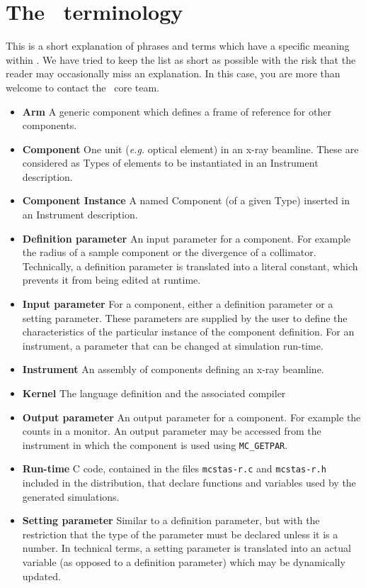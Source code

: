 
\chapter{The \MCX\ terminology}
\label{s:terminology}

This is a short explanation of phrases and terms which have a specific
meaning within \MCX. We have tried to keep the list as short
as possible with the risk that the reader may occasionally miss
an explanation. In this case, you are more than welcome to contact
the \MCX\ core team.

\noindent
\begin{itemize}
\item{\bfseries Arm}  A generic \MCX component which defines a frame of reference
      for other components.
\item{\bfseries Component} One unit ({\em e.g.} optical element) in an x-ray beamline. These are considered as Types of elements to be instantiated in an Instrument description.
\item{\bfseries Component Instance} A named Component (of a given Type) inserted in an Instrument description.
\item{\bfseries Definition parameter} An input parameter for a component. For
  example the radius of a sample component or the divergence of a collimator. Technically, a definition parameter 
  is translated into a literal constant, which prevents it from being edited at runtime. 
\item{\bfseries Input parameter} For a component, either a definition parameter
or a setting parameter. These parameters are supplied by the user to
define the characteristics of the particular instance of the component
definition. For an instrument, a parameter that can be changed at
simulation run-time.
\item{\bfseries Instrument} An assembly of \MCX components defining
      an x-ray beamline.
\item{\bfseries Kernel} The \MCX language definition and the associated compiler
\item{\bfseries Output parameter} An output parameter for a component.
  For example the counts in a monitor. An output parameter may be
  accessed from the instrument in which the component is used using
  \verb`MC_GETPAR`.
\item{\bfseries Run-time} C code, contained in the files
  \verb+mcstas-r.c+ and \verb+mcstas-r.h+ included in the \MCX
  distribution, that declare functions and variables used by the
  generated simulations.
\item{\bfseries Setting parameter} Similar to a definition parameter, but with the
  restriction that the type of the parameter must be declared unless it is a number. In technical terms, 
  a setting parameter is translated into an actual variable (as opposed to a definition parameter) which 
  may be dynamically updated.
\end{itemize}
